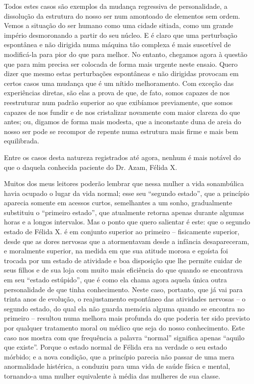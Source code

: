 Todos estes casos são exemplos da mudança regressiva de personalidade, a
dissolução da estrutura do nosso ser num amontoado de elementos sem
ordem. Vemos a situação do ser humano como uma cidade sitiada, como um
grande império desmoronando a partir do seu núcleo. E é claro que uma
perturbação espontânea e não dirigida numa máquina tão complexa é mais
suscetível de modificá-la para pior do que para melhor. No entanto,
chegamos agora à questão que para mim precisa ser colocada de forma
mais urgente neste ensaio.  Quero dizer que mesmo estas perturbações
espontâneas e não dirigidas provocam em certos casos uma mudança  que é
um nítido melhoramento.  Com exceção das experiências diretas, são elas
a prova de que, de fato, somos capazes de nos reestruturar num padrão
superior ao que exibíamos previamente, que somos capazes de nos fundir
e de nos cristalizar novamente com maior clareza do que antes; ou,
digamos de forma mais modesta, que a inconstante duna de areia do nosso
ser pode se recompor de repente numa estrutura mais firme e mais bem
equilibrada.

Entre os casos desta natureza registrados até agora, nenhum é mais 
notável do que o daquela conhecida paciente do Dr. Azam, Félida X.

Muitos dos meus leitores poderão lembrar que nessa mulher a vida
sonambúlica havia ocupado o lugar da vida normal; esse seu “segundo
estado”, que a princípio aparecia somente em acessos curtos,
semelhantes a um sonho, gradualmente substituiu o “primeiro estado”,
que atualmente retorna apenas durante algumas horas e a longos
intervalos.  Mas o ponto que quero salientar é este: que o segundo
estado de Félida X. é em conjunto superior ao primeiro -- fisicamente
superior, desde que as dores nervosas que a atormentavam desde a
infância desapareceram, e moralmente superior, na medida em que sua
atitude morosa e egoísta foi trocada por um estado de atividade e boa
disposição que lhe permite cuidar de seus filhos e de sua loja com
muito mais eficiência do que quando se encontrava em seu “estado
estúpido”, que é como ela chama agora aquela única outra personalidade
de que tinha conhecimento. Neste caso, portanto, que já vai para trinta
anos de evolução, o reajustamento espontâneo das atividades nervosas 
-- o segundo estado, do qual ela não guarda memória alguma quando se
encontra no primeiro -- resultou numa melhora mais profunda do que
poderia ter sido previsto por qualquer tratamento moral ou médico que
seja do nosso conhecimento.  Este caso nos mostra com que frequência a
palavra “normal” significa apenas “aquilo que existe”. Porque o estado
normal de Félida era na verdade o seu estado mórbido; e a nova
condição, que a princípio parecia não passar de uma mera anormalidade
histérica, a conduziu para uma vida de saúde física e mental,
tornando-a uma mulher equivalente à média das mulheres de sua classe.  

